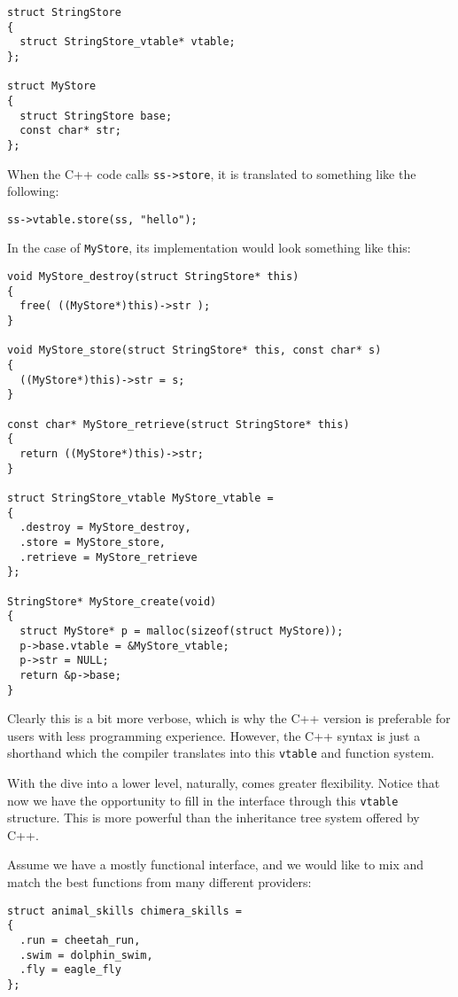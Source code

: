 \documentclass{article}
\begin{document}
\begin{lstlisting}
struct StringStore
{
  struct StringStore_vtable* vtable;
};

struct MyStore
{
  struct StringStore base;
  const char* str;
};
\end{lstlisting}

When the C++ code calls \verb+ss->store+, it is translated to
something like the following:

\begin{lstlisting}
ss->vtable.store(ss, "hello");
\end{lstlisting}

In the case of \verb+MyStore+, its implementation would look something like
this:

\begin{lstlisting}
void MyStore_destroy(struct StringStore* this)
{
  free( ((MyStore*)this)->str );
}

void MyStore_store(struct StringStore* this, const char* s)
{
  ((MyStore*)this)->str = s;
}

const char* MyStore_retrieve(struct StringStore* this)
{
  return ((MyStore*)this)->str;
}

struct StringStore_vtable MyStore_vtable =
{
  .destroy = MyStore_destroy,
  .store = MyStore_store,
  .retrieve = MyStore_retrieve
};

StringStore* MyStore_create(void)
{
  struct MyStore* p = malloc(sizeof(struct MyStore));
  p->base.vtable = &MyStore_vtable;
  p->str = NULL;
  return &p->base;
}
\end{lstlisting}

Clearly this is a bit more verbose, which is why the C++ version is preferable
for users with less programming experience.
However, the C++ syntax is just a shorthand which the compiler translates
into this \verb+vtable+ and function system.

With the dive into a lower level, naturally, comes greater flexibility.
Notice that now we have the opportunity to fill in the interface through
this \verb+vtable+ structure.
This is more powerful than the inheritance tree system offered by C++.

Assume we have a mostly functional interface, and we would like to mix and
match the best functions from many different providers:

\begin{lstlisting}
struct animal_skills chimera_skills =
{
  .run = cheetah_run,
  .swim = dolphin_swim,
  .fly = eagle_fly
};
\end{lstlisting}
\end{document}

